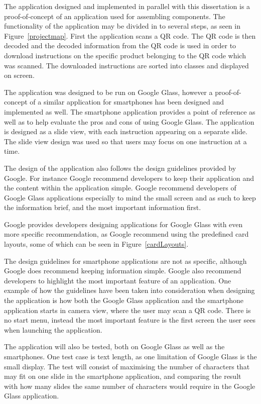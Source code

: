 The application designed and implemented in parallel with this dissertation is a proof-of-concept of an application used for assembling components. The functionality of the application may be divided in to several steps, as seen in Figure~\ref{projectmap}. First the application scans a QR code. The QR code is then decoded and the decoded information from the QR code is used in order to download instructions on the specific product belonging to the QR code which was scanned. The downloaded instructions are sorted into classes and displayed on screen.

The application was designed to be run on Google Glass, however a proof-of-concept of a similar application for smartphones has been designed and implemented as well. The smartphone application provides a point of reference as well as to help evaluate the pros and cons of using Google Glass. The application is designed as a slide view, with each instruction appearing on a separate slide. The slide view design was used so that users may focus on one instruction at a time.

The design of the application also follows the design guidelines provided by Google. For instance Google recommend developers to keep their application and the content within the application simple. Google recommend developers of Google Glass applications especially to mind the small screen and as such to keep the information brief, and the most important information first.

Google provides developers designing applications for Google Glass with even more specific recommendation, as Google recommend using the predefined card layouts, some of which can be seen in Figure~\ref{cardLayouts}.

The design guidelines for smartphone applications are not as specific, although Google does recommend keeping information simple. Google also recommend developers to highlight the most important feature of an application. One example of how the guidelines have been taken into consideration when designing the application is how both the Google Glass application and the smartphone application starts in camera view, where the user may scan a QR code. There is no start menu, instead the most important feature is the first screen the user sees when launching the application.

The application will also be tested, both on Google Glass as well as the smartphones. One test case is text length, as one limitation of Google Glass is the small display. The test will consist of maximising the number of characters that may fit on one slide in the smartphone application, and comparing the result with how many slides the same number of characters would require in the Google Glass application.

